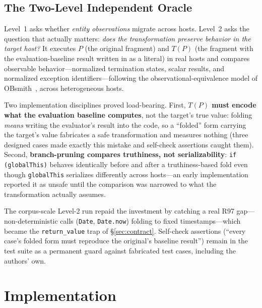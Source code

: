\documentclass[sigconf,nonacm]{acmart}
\begin{document}
\subsection{The Two-Level Independent Oracle}\label{sec:oracle}

Level~1 asks whether \emph{entity observations} migrate across hosts. Level~2 asks the question that actually matters: \emph{does the transformation preserve behavior in the target host?} It executes $P$ (the original fragment) and $T(P)$ (the fragment with the evaluation-baseline result written in as a literal) in real hosts and compares observable behavior---normalized termination states, scalar results, and normalized exception identifiers---following the observational-equivalence model of OBsmith~\cite{obsmith}, across heterogeneous hosts.

Two implementation disciplines proved load-bearing. First, \textbf{$T(P)$ must encode what the evaluation baseline computes}, not the target's true value: folding \emph{means} writing the evaluator's result into the code, so a ``folded'' form carrying the target's value fabricates a safe transformation and measures nothing (three designed cases made exactly this mistake and self-check assertions caught them). Second, \textbf{branch-pruning compares truthiness, not serializability}: \texttt{if (globalThis)} behaves identically before and after a truthiness-based fold even though \texttt{globalThis} serializes differently across hosts---an early implementation reported it as unsafe until the comparison was narrowed to what the transformation actually assumes.

The corpus-scale Level-2 run repaid the investment by catching a real R97 gap---non-deterministic calls (\texttt{Date}, \texttt{Date.now}) folding to fixed timestamps---which became the \texttt{return\_value} trap of \S\ref{sec:contract}. Self-check assertions (``every case's folded form must reproduce the original's baseline result'') remain in the test suite as a permanent guard against fabricated test cases, including the authors' own.

\section{Implementation}\label{sec:impl}
\end{document}
